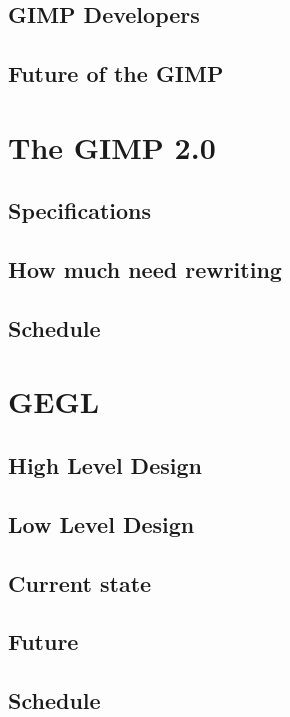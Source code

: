 \documentclass{report}
\begin{document}
\section{GIMP Developers}
\section{Future of the GIMP} 


\chapter{The GIMP 2.0}

\section{Specifications}
\section{How much need rewriting}
\section{Schedule}

\chapter{GEGL}

\section{High Level Design}

\section{Low Level Design}

\section{Current state}
\section{Future}
\section{Schedule}
\end{document}
